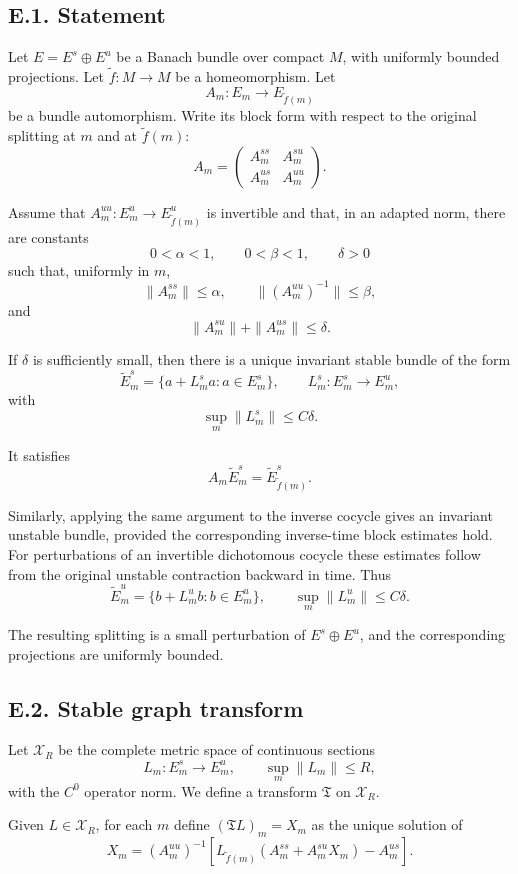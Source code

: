 \documentclass[12pt,a4paper]{article}
\theoremstyle{plain}
\numberwithin{equation}{section}
\numberwithin{theorem}{section}
\begin{document}
\subsection{E.1. Statement}

Let $E=E^s\oplus E^u$ be a Banach bundle over compact $M$, with uniformly bounded projections. Let $\widetilde f:M\to M$ be a homeomorphism. Let
\[
A_m:E_m\to E_{\widetilde f(m)}
\]
be a bundle automorphism. Write its block form with respect to the original splitting at $m$ and at $\widetilde f(m)$:
\[
A_m=
\begin{pmatrix}
A_m^{ss} & A_m^{su}\\
A_m^{us} & A_m^{uu}
\end{pmatrix}.
\]

Assume that $A_m^{uu}:E_m^u\to E_{\widetilde f(m)}^u$ is invertible and that, in an adapted norm, there are constants
\[
0<\alpha<1,
\qquad
0<\beta<1,
\qquad
\delta>0
\]
such that, uniformly in $m$,
\[
\|A_m^{ss}\|\le\alpha,
\qquad
\|(A_m^{uu})^{-1}\|\le\beta,
\]
and
\[
\|A_m^{su}\|+
\|A_m^{us}\|\le\delta.
\]

If $\delta$ is sufficiently small, then there is a unique invariant stable bundle of the form
\[
\widetilde E_m^s=
\{a+L_m^s a:a\in E_m^s\},
\qquad
L_m^s:E_m^s\to E_m^u,
\]
with
\[
\sup_m\|L_m^s\|\le C\delta.
\]

It satisfies
\[
A_m\widetilde E_m^s=
\widetilde E_{\widetilde f(m)}^s.
\]

Similarly, applying the same argument to the inverse cocycle gives an invariant unstable bundle, provided the corresponding inverse-time block estimates hold. For perturbations of an invertible dichotomous cocycle these estimates follow from the original unstable contraction backward in time. Thus
\[
\widetilde E_m^u=
\{b+L_m^u b:b\in E_m^u\},
\qquad
\sup_m\|L_m^u\|\le C\delta.
\]

The resulting splitting is a small perturbation of $E^s\oplus E^u$, and the corresponding projections are uniformly bounded.

\subsection{E.2. Stable graph transform}

Let $\mathcal X_R$ be the complete metric space of continuous sections
\[
L_m:E_m^s\to E_m^u,
\qquad
\sup_m\|L_m\|\le R,
\]
with the $C^0$ operator norm. We define a transform $\mathfrak T$ on $\mathcal X_R$.

Given $L\in\mathcal X_R$, for each $m$ define $(\mathfrak T L)_m=X_m$ as the unique solution of
\[
X_m
=
(A_m^{uu})^{-1}
\left[
L_{\widetilde f(m)}(A_m^{ss}+A_m^{su}X_m)-A_m^{us}
\right].
\]
\end{document}

